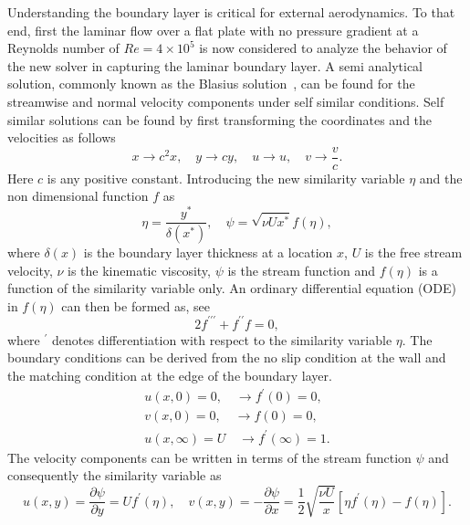 Understanding the boundary layer is critical for external aerodynamics. To that end, first the laminar flow over a flat plate with no pressure gradient at a Reynolds number of $Re = 4\times10^5$ is now considered to analyze the behavior of the new solver in capturing the laminar boundary layer. A semi analytical solution, commonly known as the Blasius solution~\cite{schlichting2016boundary}, can be found for the streamwise and normal velocity components under self similar conditions. Self similar solutions can be found by first transforming the coordinates and the velocities as follows
\begin{equation}
x \rightarrow c^2 x, \quad y \rightarrow cy, \quad u \rightarrow u, \quad v \rightarrow \frac{v}{c}.
\end{equation}
Here $c$ is any positive constant. Introducing the new similarity variable $\eta$ and the non dimensional function $f$ as
\begin{equation}
\eta = \frac{y^{\ast}}{\delta(x^{\ast})}, \quad \psi = \sqrt{\nu U x^{\ast}}f(\eta),
\end{equation} 
where $\delta(x)$ is the boundary layer thickness at a location $x$, $U$ is the free stream velocity, $\nu$ is the kinematic viscosity, $\psi$ is the stream function and $f(\eta)$ is a function of the similarity variable only. An ordinary differential equation (ODE) in $f(\eta)$ can then be formed as, see~\cite{schlichting2016boundary} 
\begin{equation}
2f^{\prime\prime\prime} + f^{\prime \prime} f = 0,
\label{eq:blasius}
\end{equation}
where $^{\prime}$ denotes differentiation with respect to the similarity variable $\eta$. The boundary conditions can be derived from the no slip condition at the wall and the matching condition at the edge of the boundary layer.
\begin{align*}
u(x,0) = 0, \quad \rightarrow f^{\prime}(0) = 0, \\
v(x,0) = 0, \quad \rightarrow f(0) = 0, \\
u(x,\infty) = U \quad \rightarrow f^{\prime}(\infty) = 1.
\end{align*}
The velocity components can be written in terms of the stream function $\psi$ and consequently the similarity variable as
\begin{equation}
u(x,y) = \frac{\partial \psi}{\partial y} = U f^{\prime}(\eta), \quad 
v(x,y) = -\frac{\partial \psi}{\partial x} = \frac{1}{2}\sqrt{\frac{\nu U}{x}}[\eta f^{\prime}(\eta) - f(\eta)].
\end{equation}
